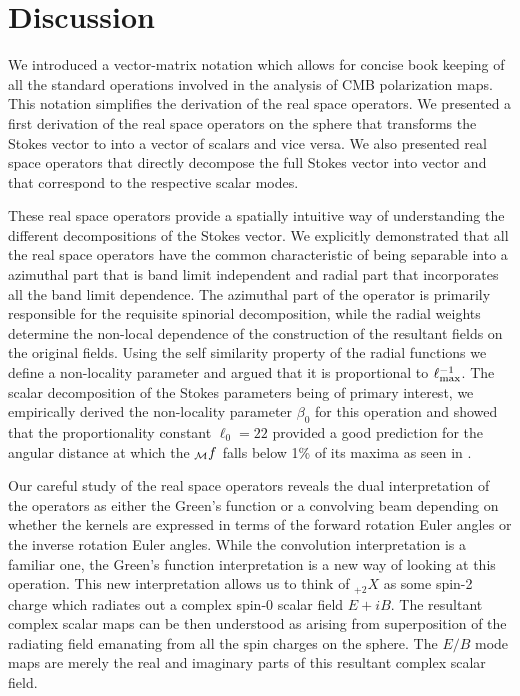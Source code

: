 \section{Discussion}\label{sec:discussion}

We introduced a vector-matrix notation which allows for concise book keeping of all the standard operations involved in the analysis of CMB polarization maps. This notation simplifies the derivation of the real space operators. We presented a first derivation of the real space operators on the sphere that transforms the Stokes vector \vp{} to into a vector of scalars \vs{} and vice versa. We also presented real space operators that directly decompose the full Stokes vector \vp{} into vector  and  that correspond to the respective scalar modes.

These real space operators provide a spatially intuitive way of understanding the different decompositions of the Stokes vector. We explicitly  demonstrated that all the real space operators have the common characteristic  of being separable into a azimuthal part that is band limit independent and radial part that incorporates all the band limit dependence. The azimuthal part of the operator is primarily responsible for the requisite spinorial decomposition, while the radial weights determine the non-local dependence of the construction of the resultant fields on the original fields. Using the self similarity property of the radial functions we define a non-locality parameter and argued that it is proportional to $\ell_{\rm max}^{-1}$. The scalar decomposition of the Stokes parameters being of primary interest,  we empirically derived the non-locality parameter $\beta_0$ for this operation and showed that the proportionality constant $\ell_{0}=22$ provided a good prediction for the angular distance at which the ${}_{\mathcal{M}}f$ falls below 1\% of its maxima as seen in .

Our careful study of the real space operators reveals the dual interpretation of the operators as either the Green's function or a convolving beam depending on whether the kernels are expressed in terms of the forward rotation Euler angles or the inverse rotation Euler angles. While the convolution interpretation is a familiar one, the Green's function interpretation is a new way of looking at this operation. This new interpretation allows us to think of ${}_{+2}X$ as some spin-2 charge which radiates out a complex spin-0 scalar field $E+iB$. The resultant complex scalar maps can be then understood as arising from superposition of the radiating field emanating from all the spin charges on the sphere. The $E/B$ mode maps are merely the real and imaginary parts of this resultant complex scalar field.

